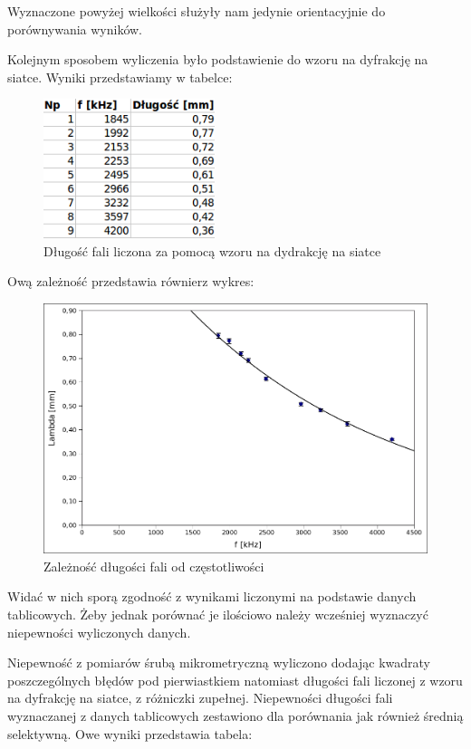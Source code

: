 \documentclass[a4paper,12pt]{article}
\begin{document}
Wyznaczone powyżej wielkości służyły nam jedynie orientacyjnie do porównywania wyników. 

Kolejnym sposobem wyliczenia było podstawienie do wzoru na dyfrakcję na siatce. Wyniki przedstawiamy w tabelce: 

\begin{figure} [H]
  \begin{center}
    \includegraphics[width = 5cm]{tab4.png}
    \caption{Długość fali liczona za pomocą wzoru na dydrakcję na siatce}
  \end{center}
\end{figure}

Ową zależność przedstawia równierz wykres: 

\begin{figure} [H]
  \begin{center}
    \includegraphics[width = 12cm]{wykres1.png}
    \caption{Zależność długości fali od częstotliwości}
  \end{center}
\end{figure}

Widać w nich sporą zgodność z wynikami liczonymi na podstawie danych tablicowych. Żeby jednak porównać je ilościowo należy wcześniej wyznaczyć niepewności wyliczonych danych. 

Niepewność z pomiarów śrubą mikrometryczną wyliczono dodając kwadraty poszczególnych błędów pod pierwiastkiem natomiast długości fali liczonej z wzoru na dyfrakcję na siatce, z różniczki zupełnej. Niepewności długości fali wyznaczanej z danych tablicowych zestawiono dla porównania jak również średnią selektywną. Owe wyniki przedstawia tabela: 
\end{document}
